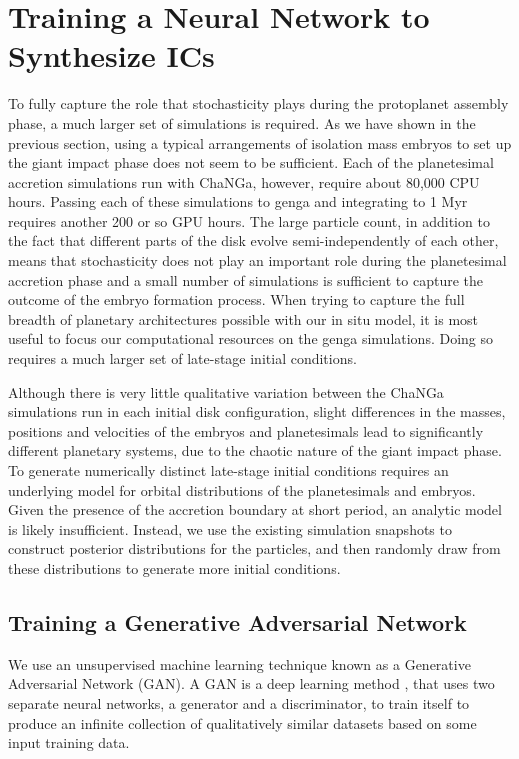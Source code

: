 \section{Training a Neural Network to Synthesize ICs} \label{sec:neuralICs}

To fully capture the role that stochasticity plays during the protoplanet assembly phase, a much larger set of simulations is required. As we have shown in the previous section, using a typical arrangements of isolation mass embryos to set up the giant impact phase does not seem to be sufficient. Each of the planetesimal accretion simulations run with {\sc ChaNGa}, however, require about 80,000 CPU hours. Passing each of these simulations to {\sc genga} and integrating to 1 Myr requires another 200 or so GPU hours. The large particle count, in addition to the fact that different parts of the disk evolve semi-independently of each other, means that stochasticity does not play an important role during the planetesimal accretion phase and a small number of simulations is sufficient to capture the outcome of the embryo formation process. When trying to capture the full breadth of planetary architectures possible with our in situ model, it is most useful to focus our computational resources on the {\sc genga} simulations. Doing so requires a much larger set of late-stage initial conditions.

Although there is very little qualitative variation between the {\sc ChaNGa} simulations run in each initial disk configuration, slight differences in the masses, positions and velocities of the embryos and planetesimals lead to significantly different planetary systems, due to the chaotic nature of the giant impact phase. To generate numerically distinct late-stage initial conditions requires an underlying model for orbital distributions of the planetesimals and embryos. Given the presence of the accretion boundary at short period, an analytic model is likely insufficient. Instead, we use the existing simulation snapshots to construct posterior distributions for the particles, and then randomly draw from these distributions to generate more initial conditions.

\subsection{Training a Generative Adversarial Network}

We use an unsupervised machine learning technique known as a Generative Adversarial Network (GAN). A GAN is a deep learning method \cite{goodfellow14}, that uses two separate neural networks, a generator and a discriminator, to train itself to produce an infinite collection of qualitatively similar datasets based on some input training data.

